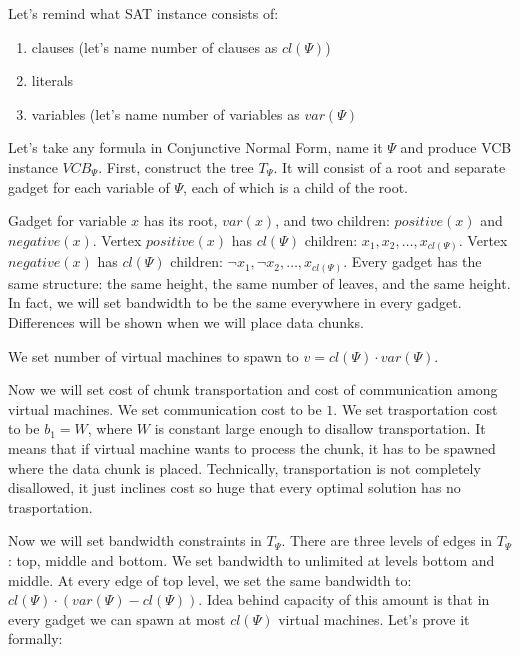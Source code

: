Let's remind what SAT instance consists of:
\begin{enumerate}
\item clauses (let's name number of clauses as $cl(\Psi)$)
\item literals
\item variables (let's name number of variables as $var(\Psi)$
\end{enumerate}

Let's take any formula in Conjunctive Normal Form, name it $\Psi$ and produce
VCB instance $VCB_{\Psi}$. First, construct the tree $T_{\Psi}$. It will consist of
a root and separate gadget for each variable of $\Psi$, each of which
is a child of the root.


Gadget for variable $x$ has its root, $var(x)$, and two children:
$positive(x)$ and $negative(x)$. Vertex $positive(x)$ has $cl(\Psi)$
children: $x_1, x_2, \ldots, x_{cl(\Psi)}$. Vertex $negative(x)$ has
$cl(\Psi)$ children: $\neg x_1, \neg x_2, \dots, x_{cl(\Psi)}$. Every
gadget has the same structure: the same height, the same number of
leaves, and the same height. In fact, we will set bandwidth to be the
same everywhere in every gadget. Differences will be shown when we
will place data chunks.


We set number of virtual machines to spawn to $v = cl(\Psi) \cdot var(\Psi)$.

Now we will set cost of chunk transportation and cost of communication
among virtual machines. We set communication cost to be $1$. We set
trasportation cost to be $b_1 = W$, where $W$ is constant large enough
to disallow transportation. It means that if virtual machine wants to
process the chunk, it has to be spawned where the data chunk is
placed. Technically, transportation is not completely disallowed, it
just inclines cost so huge that every optimal solution has no
trasportation.

Now we will set bandwidth constraints in $T_{\Psi}$. There are three
levels of edges in $T_{\Psi}$: top, middle and bottom. We set
bandwidth to unlimited at levels bottom and middle. At every edge of
top level, we set the same bandwidth to: $cl(\Psi) \cdot (var(\Psi) -
cl(\Psi))$. Idea behind capacity of this amount is that in every gadget we can
spawn at most $cl(\Psi)$ virtual machines. Let's prove it formally:

